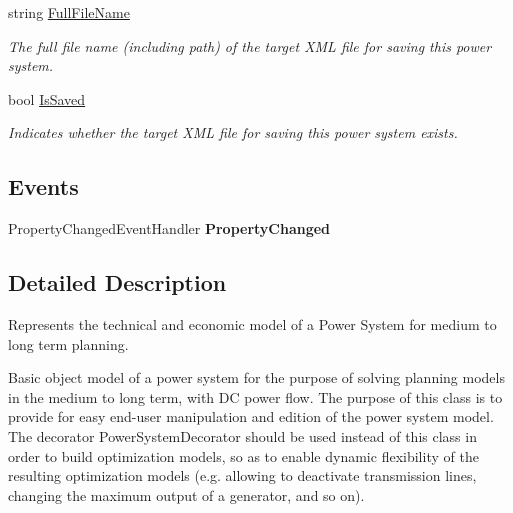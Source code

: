 \begin{DoxyCompactItemize}
\item 
string \hyperlink{class_power_system_planning_1_1_power_system_abf9f7281d0dd5e23a567c6ddef5f8b91}{Full\+File\+Name}
\begin{DoxyCompactList}\small\item\em The full file name (including path) of the target X\+ML file for saving this power system. \end{DoxyCompactList}\item 
bool \hyperlink{class_power_system_planning_1_1_power_system_a3c5e0bcb79c013e7ed5bdc2acda52d2d}{Is\+Saved}
\begin{DoxyCompactList}\small\item\em Indicates whether the target X\+ML file for saving this power system exists. \end{DoxyCompactList}\end{DoxyCompactItemize}
\subsection*{Events}
\begin{DoxyCompactItemize}
\item 
Property\+Changed\+Event\+Handler {\bfseries Property\+Changed}\hypertarget{class_power_system_planning_1_1_power_system_a400c9ff42ee997f4cda3942b77ba6c5b}{}\label{class_power_system_planning_1_1_power_system_a400c9ff42ee997f4cda3942b77ba6c5b}

\end{DoxyCompactItemize}


\subsection{Detailed Description}
Represents the technical and economic model of a Power System for medium to long term planning. 

Basic object model of a power system for the purpose of solving planning models in the medium to long term, with DC power flow. The purpose of this class is to provide for easy end-\/user manipulation and edition of the power system model. The decorator Power\+System\+Decorator should be used instead of this class in order to build optimization models, so as to enable dynamic flexibility of the resulting optimization models (e.\+g. allowing to deactivate transmission lines, changing the maximum output of a generator, and so on). 

